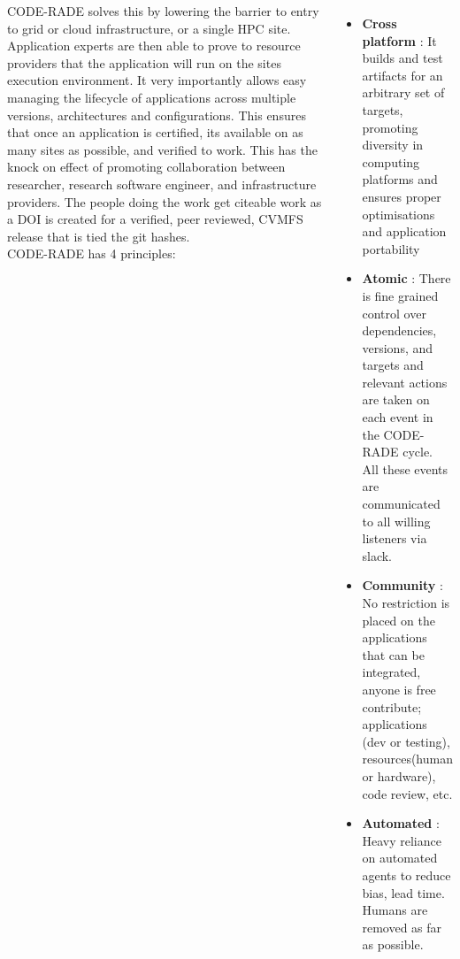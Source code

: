 \documentclass[17pt, a0paper, landscape, margin=0mm, innermargin=15mm,
     blockverticalspace=5mm, colspace=5mm, subcolspace=8mm]{tikzposter} %
\begin{document}
\begin{columns}
{             CODE-RADE solves this by lowering the barrier to entry to grid or cloud infrastructure, or a single HPC site. 
                  Application experts are then able to prove to resource providers that the application will run on the sites execution environment. 
                  It very importantly allows easy  managing the lifecycle of applications across multiple versions, architectures and configurations. 
                  This ensures that once an application is certified, its available on as many sites as possible, and verified to work.
                  This has the knock on effect of promoting collaboration between researcher, research software engineer, and infrastructure providers. 
                  The people doing the work get citeable work as a DOI is created for a verified, peer reviewed, CVMFS release that is tied the git hashes. 
         \vspace{0.5cm}\\
         CODE-RADE has 4 principles:
         \begin{itemize}
                 \item \textbf{Cross platform} : It builds and test artifacts for an arbitrary set of targets, promoting diversity in computing platforms and ensures proper optimisations and application portability 
                \item \textbf{Atomic} :
                                 There is fine grained control over dependencies, versions, and targets and relevant actions are taken on each event in the CODE-RADE cycle. \\
                                 All these events are communicated to all willing listeners via slack.
                  \item \textbf{Community} :
                      No restriction is placed on the applications that can be integrated, anyone is free contribute; applications (dev or testing), resources(human or hardware), code review, etc. 
                  \item \textbf{Automated} :
                      Heavy reliance on automated agents to reduce bias, lead time. Humans are removed as far as possible.
             \end{itemize}

         }



\end{columns}
\end{document}
